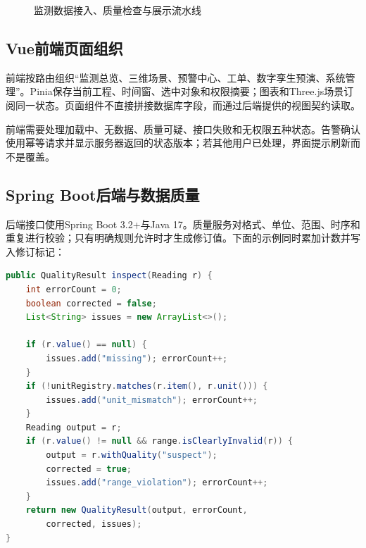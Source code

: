 \begin{figure}[htbp]
\centering
{}
\caption{监测数据接入、质量检查与展示流水线}
\label{fig:monitoring-data-pipeline}
\end{figure}

\subsection{Vue前端页面组织}

前端按路由组织“监测总览、三维场景、预警中心、工单、数字孪生预演、系统管理”。Pinia保存当前工程、时间窗、选中对象和权限摘要；图表和Three.js场景订阅同一状态。页面组件不直接拼接数据库字段，而通过后端提供的视图契约读取。

前端需要处理加载中、无数据、质量可疑、接口失败和无权限五种状态。告警确认使用幂等请求并显示服务器返回的状态版本；若其他用户已处理，界面提示刷新而不是覆盖。

\subsection{Spring Boot后端与数据质量}

后端接口使用Spring Boot 3.2+与Java 17。质量服务对格式、单位、范围、时序和重复进行校验；只有明确规则允许时才生成修订值。下面的示例同时累加计数并写入修订标记：

\begin{lstlisting}[language=Java]
public QualityResult inspect(Reading r) {
    int errorCount = 0;
    boolean corrected = false;
    List<String> issues = new ArrayList<>();

    if (r.value() == null) {
        issues.add("missing"); errorCount++;
    }
    if (!unitRegistry.matches(r.item(), r.unit())) {
        issues.add("unit_mismatch"); errorCount++;
    }
    Reading output = r;
    if (r.value() != null && range.isClearlyInvalid(r)) {
        output = r.withQuality("suspect");
        corrected = true;
        issues.add("range_violation"); errorCount++;
    }
    return new QualityResult(output, errorCount,
        corrected, issues);
}
\end{lstlisting}

